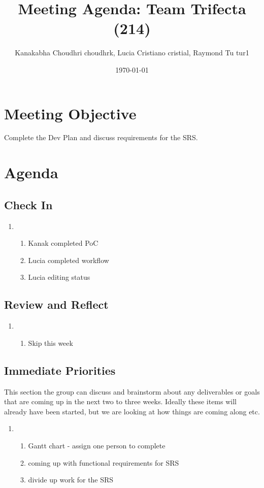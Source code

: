 \documentclass{article}
\title{Meeting Agenda: Team Trifecta (214)}
\author{Kanakabha Choudhri choudhrk, Lucia Cristiano cristial, Raymond Tu tur1}
\date{\today}
\begin{document}
\maketitle

\section*{Meeting Objective}
Complete the Dev Plan and discuss requirements for the SRS. 

\section*{Agenda}
\subsection*{Check In}

\begin{enumerate}
    \item 
    \begin{enumerate}
        \item Kanak completed PoC
        \item Lucia completed workflow
        \item Lucia editing status
    \end{enumerate}
\end{enumerate}
   

\subsection*{Review and Reflect}
\begin{enumerate}
    \item
    \begin{enumerate}
        \item Skip this week
    \end{enumerate}
\end{enumerate}


\subsection*{Immediate Priorities}
This section the group can discuss and brainstorm about any deliverables or goals that are coming up in the next two to three weeks. Ideally these items will already have been started, but we are looking at how things are coming along etc.
\begin{enumerate}
    \item
    \begin{enumerate}
        \item Gantt chart - assign one person to complete
        \item coming up with functional requirements for SRS
        \item divide up work for the SRS
    \end{enumerate}
\end{enumerate}
\end{document}
